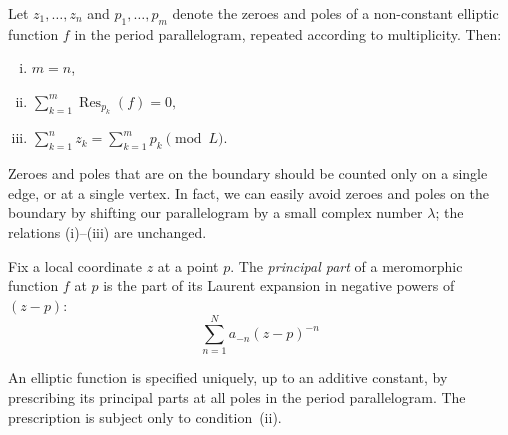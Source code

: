 \documentclass[12pt]{article}
\begin{document}
\begin{theorem}
Let $z_1, \dots, z_n$ and $p_1, \dots, p_m$ denote the zeroes and poles of a non-constant elliptic function $f$ in the period parallelogram, repeated according to multiplicity. Then:
\begin{enumerate}[(i)]
    \item $m = n$,
    \item $\displaystyle \sum_{k=1}^m \operatorname{Res}_{p_k}(f) = 0,$
    \item $\displaystyle \sum_{k=1}^n z_k = \sum_{k=1}^m p_k \pmod{L}.$
\end{enumerate}
\end{theorem}

\begin{remark}
Zeroes and poles that are on the boundary should be counted only on a single edge, or at a single vertex. 
In fact, we can easily avoid zeroes and poles on the boundary by shifting our parallelogram by a small complex number $\lambda$; 
the relations (i)--(iii) are unchanged.
\end{remark}

\begin{definition}
    Fix a local coordinate $z$ at a point $p$. The \emph{principal part} of a meromorphic function $f$ at $p$ is the part of its Laurent expansion in negative powers of $(z-p)$:
\[\sum_{n=1}^N a_{-n}(z-p)^{-n}\]
\end{definition}


\begin{theorem}
An elliptic function is specified uniquely, up to an additive constant, 
by prescribing its principal parts at all poles in the period parallelogram. 
The prescription is subject only to condition~(ii).
\end{theorem}
\end{document}
